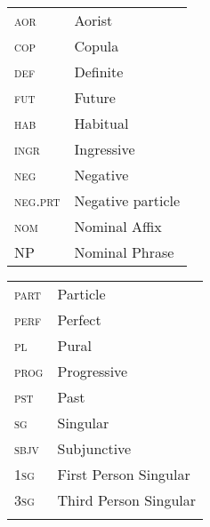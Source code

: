 \documentclass[output=paper,newtxmath,modfonts,nonflat,hidelinks]{langsci/langscibook}
\begin{document}
\begin{tabularx}{.45\textwidth}{lQ}
\textsc{aor} & Aorist \\
\textsc{cop} & Copula\\
 \textsc{def}&  Definite\\
 \textsc{fut}&  Future\\
 \textsc{hab}&  Habitual\\
\textsc{ingr}&  Ingressive\\
\textsc{neg}&  Negative \\
\textsc{neg.prt} &  Negative particle\\
 \textsc{nom} & Nominal Affix\\
 NP &  Nominal Phrase\\
\end{tabularx}
\begin{tabularx}{.45\textwidth}{lQ}
 \textsc{part} & Particle\\
 \textsc{perf}&  Perfect\\
 \textsc{pl}&  Pural\\
 \textsc{prog}&  Progressive\\
 \textsc{pst} & Past\\
 \textsc{sg} & Singular\\
 \textsc{sbjv} & Subjunctive\\
 1\textsc{sg}&  First Person Singular\\
 3\textsc{sg}&  Third Person Singular\\
 \\
 
\end{tabularx}



\sloppy
\printbibliography[heading=subbibliography,notkeyword=this]
\end{document}
